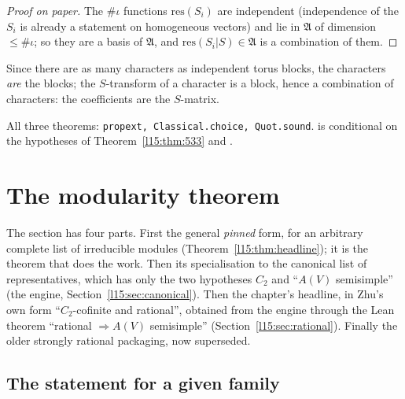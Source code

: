 \begin{proof}[Proof on paper]
The $\#\iota$ functions $\mathrm{res}(S_i)$ are independent (independence of the $S_i$ is already a statement on homogeneous
vectors) and lie in $\mathfrak A$ of dimension $\le\#\iota$; so they are a basis of $\mathfrak A$, and
$\mathrm{res}(S_i|S)\in\mathfrak A$ is a combination of them.
\end{proof}

\begin{physics}
Since there are as many characters as independent torus blocks, the characters \emph{are} the blocks; the $S$-transform of a
character is a block, hence a combination of characters: the coefficients are the $S$-matrix.
\end{physics}

\begin{status}
All three theorems: \texttt{propext, Classical.choice, Quot.sound}. \allowbreak{}\allowbreak{} is
conditional on the hypotheses of Theorem~\ref{l15:thm:533} and .
\end{status}

\section{The modularity theorem}\label{l15:sec:headline}

The section has four parts. First the general \emph{pinned} form, for an arbitrary complete list of irreducible modules
(Theorem~\ref{l15:thm:headline}); it is the theorem that does the work. Then its specialisation to the canonical list of
representatives, which has only the two hypotheses $C_2$ and ``$A(V)$ semisimple'' (the engine,
Section~\ref{l15:sec:canonical}). Then the chapter's headline, in Zhu's own form ``$C_2$-cofinite and rational'', obtained
from the engine through the Lean theorem ``rational $\Rightarrow A(V)$ semisimple'' (Section~\ref{l15:sec:rational}).
Finally the older strongly rational packaging, now superseded.

\subsection{The statement for a given family}

